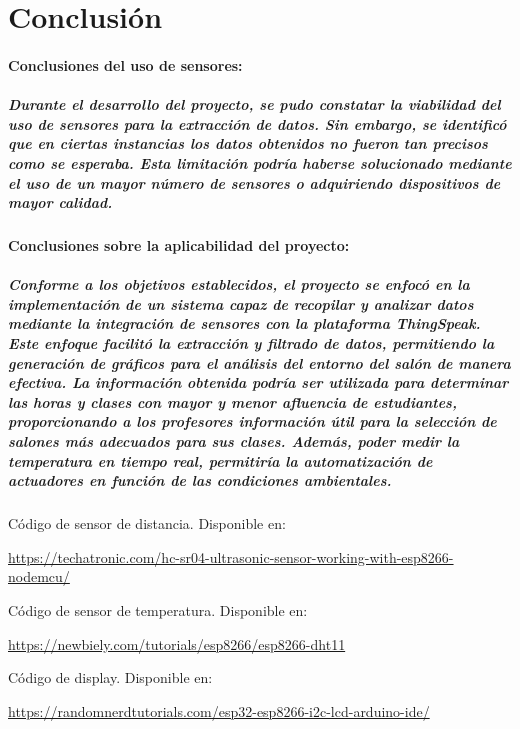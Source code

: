 \documentclass[12pt]{article} %
\newcommand{\normalsubparagraph}[1]{\subparagraph{\textnormal{#1}}}
\newcommand{\normalparagraph}[1]{\paragraph{\textnormal{#1}}}
\begin{document}
\newpage
\section{Conclusión} %

\normalparagraph{Conclusiones del uso de sensores:}
\normalsubparagraph {Durante el desarrollo del proyecto, se pudo constatar la viabilidad del uso de sensores para la extracción de datos. Sin embargo, se identificó que en ciertas instancias los datos obtenidos no fueron tan precisos como se esperaba. Esta limitación podría haberse solucionado mediante el uso de un mayor número de sensores o adquiriendo dispositivos de mayor calidad.
}
\normalparagraph{Conclusiones sobre la aplicabilidad del proyecto:}
\normalsubparagraph {Conforme a los objetivos establecidos, el proyecto se enfocó en la implementación de un sistema capaz de recopilar y analizar datos mediante la integración de sensores con la plataforma ThingSpeak. Este enfoque facilitó la extracción y filtrado de datos, permitiendo la generación de gráficos para el análisis del entorno del salón de manera efectiva. 
La información obtenida podría ser utilizada para determinar las horas y clases con mayor y menor afluencia de estudiantes, proporcionando a los profesores información útil para la selección de salones más adecuados para sus clases. Además, poder medir la temperatura en tiempo real, permitiría la automatización de actuadores en función de las condiciones ambientales.}


\begin{thebibliography}{99} %

Código de sensor de distancia. Disponible en: 
\begin{minipage}[t]{0.8\textwidth}
\url{https://techatronic.com/hc-sr04-ultrasonic-sensor-working-with-esp8266-nodemcu/}
\end{minipage}

Código de sensor de temperatura. Disponible en: 
\begin{minipage}[t]{0.8\textwidth}
\url{https://newbiely.com/tutorials/esp8266/esp8266-dht11}
\end{minipage}

Código de display. Disponible en: 
\begin{minipage}[t]{0.8\textwidth}
\url{https://randomnerdtutorials.com/esp32-esp8266-i2c-lcd-arduino-ide/}
\end{minipage}


\end{thebibliography}
\end{document}
